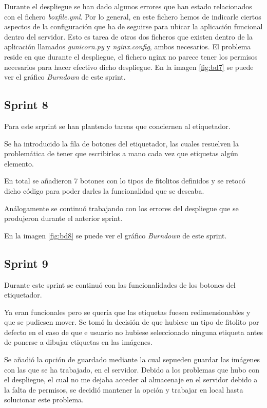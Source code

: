 Durante el despliegue se han dado algunos errores que han estado relacionados con el fichero \textit{boxfile.yml}. Por lo general, en este fichero hemos de indicarle ciertos aspectos de la configuración que ha de seguirse para ubicar la aplicación funcional dentro del servidor. Esto es tarea de otros dos ficheros que existen dentro de la aplicación llamados \textit{gunicorn.py} y \textit{nginx.config}, ambos necesarios. El problema reside en que durante el despliegue, el fichero nginx no parece tener los permisos necesarios para hacer efectivo dicho despliegue. 
En la imagen \ref{fig:bd7} se puede ver el gráfico \textit{Burndown} de este sprint.
\subsection{Sprint 8}

Para este srprint se han planteado tareas que conciernen al etiquetador. 

Se ha introducido la fila de botones del etiquetador, las cuales resuelven la problemática de tener que escribirlos a mano cada vez que etiquetas algún elemento.

En total se añadieron 7 botones con lo tipos de fitolitos definidos y se retocó dicho código para poder darles la funcionalidad que se deseaba.

Análogamente se continuó trabajando con los errores del despliegue que se produjeron durante el anterior sprint.

En la imagen \ref{fig:bd8} se puede ver el gráfico \textit{Burndown} de este sprint.
\subsection{Sprint 9}

Durante este sprint se continuó con las funcionalidades de los botones del etiquetador.

Ya eran funcionales pero se quería que las etiquetas fuesen redimensionables y que se pudiesen mover.
Se tomó la decisión de que hubiese un tipo de fitolito por defecto en el caso de que e usuario no hubiese seleccionado ninguna etiqueta antes de ponerse a dibujar etiquetas en las imágenes.

Se añadió la opción de guardado mediante la cual sepueden guardar las imágenes con las que se ha trabajado, en el servidor. Debido a los problemas que hubo con el despliegue, el cual no me dejaba acceder al almacenaje en el servidor debido a la falta de permisos, se decidió mantener la opción y trabajar en local hasta solucionar este problema.

